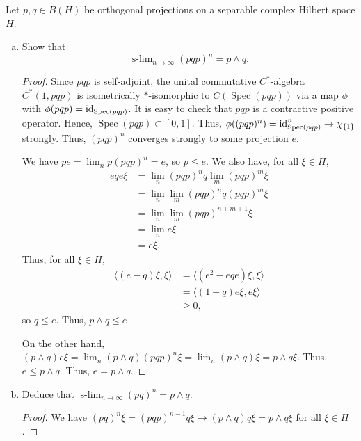 \documentclass{article}
\DeclareMathOperator{\Spec}{Spec}
\DeclareMathOperator{\slim}{s-lim}
\begin{document}
   Let $p,q \in B(H)$ be orthogonal projections on a separable complex Hilbert space $H$.
  \begin{enumerate}[(a)]
  \item Show that
    $$\slim_{n \to \infty} (pqp)^n = p \wedge q.$$
    \begin{proof}
      Since $pqp$ is self-adjoint, the unital commutative $C^*$-algebra $C^*(1, pqp)$ is isometrically $*$-isomorphic to $C(\Spec(pqp))$ via a map $\phi$ with $\phi(pqp) = \id_{\Spec(pqp)}$.  It is easy to check that $pqp$ is a contractive positive operator. Hence, $\Spec(pqp) \subset [0,1]$.  Thus, $\phi((pqp)^n) = \id_{\Spec(pqp)}^n \to \chi_{\{1\}}$ strongly.  Thus, $(pqp)^n$ converges strongly to some projection $e$.


      We have $pe = \lim_n p (pqp)^n = e$, so $p \le e$.  We also have, for all $\xi \in H$,
      \begin{align*}
        eqe \xi & = \lim_n (pqp)^n q \lim_m (pqp)^m \xi  \\
        & = \lim_n \lim_m (pqp)^n q (pqp)^m \xi \\
        & = \lim_{n} \lim_m (pqp)^{n + m + 1} \xi \\
        & = \lim_n e \xi \\
        & = e \xi.
      \end{align*}
      Thus, for all $\xi \in H$,
      \begin{align*}
        \langle (e - q)\xi,  \xi \rangle & = \langle (e^2 - eqe) \xi,  \xi \rangle \\
        & = \langle (1 - q) e \xi, e \xi \rangle \\
        & \ge 0,
      \end{align*}
      so $q \le e$.  Thus, $p \wedge q \le e$

      On the other hand, $(p \wedge q) e \xi = \lim_n (p \wedge q) (pqp)^n \xi = \lim_n (p \wedge q) \xi = p \wedge q \xi$.  Thus,
      $e \le p \wedge q$.  Thus, $e = p \wedge q$.
    \end{proof}

  \item Deduce that $\slim_{n \to \infty} (pq)^n = p \wedge q$.
    \begin{proof}
      We have $(pq)^n \xi = (pqp)^{n-1}q \xi \to (p \wedge q) q \xi = p \wedge q \xi$ for all $\xi \in H$.
    \end{proof}


\end{enumerate}
\end{document}
